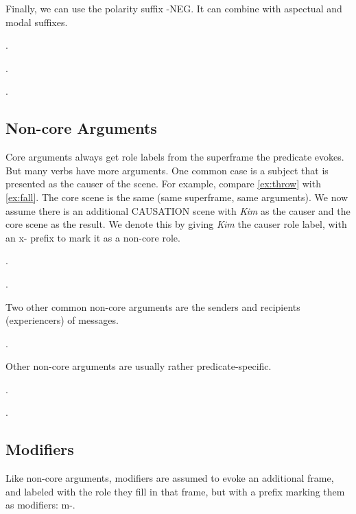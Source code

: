 \documentclass[a4paper]{article}
\newcommand{\fr}[1]{\textsf{#1}}
\newcommand{\frs}[1]{\mbox{\textsf{#1}}} %
\newcommand{\rl}[1]{\textsf{#1}}
\begin{document}
Finally, we can use the polarity suffix \frs{-NEG}. It can combine with aspectual and modal suffixes.

\ex.

\ex.

\ex.

\newpage\subsection{Non-core Arguments}

Core arguments always get role labels from the superframe the predicate evokes.
But many verbs have more arguments. One common case is a subject that is
presented as the causer of the scene. For example, compare \ref{ex:throw} with
\ref{ex:fall}. The core scene is the same (same superframe, same arguments). We
now assume there is an additional \fr{CAUSATION} scene with \emph{Kim} as the
\rl{causer} and the core scene as the \rl{result}. We denote this by giving
\emph{Kim} the \rl{causer} role label, with an \rl{x-} prefix to mark it as a
non-core role.

\ex.\label{ex:throw}

\ex.

Two other common non-core arguments are the senders and recipients (experiencers) of messages.

\ex.

Other non-core arguments are usually rather predicate-specific.

\ex.

\ex.

\newpage\subsection{Modifiers}

Like non-core arguments, modifiers are assumed to evoke an additional frame,
and labeled with the role they fill in that frame, but with a prefix marking
them as modifiers: \rl{m-}.
\end{document}
